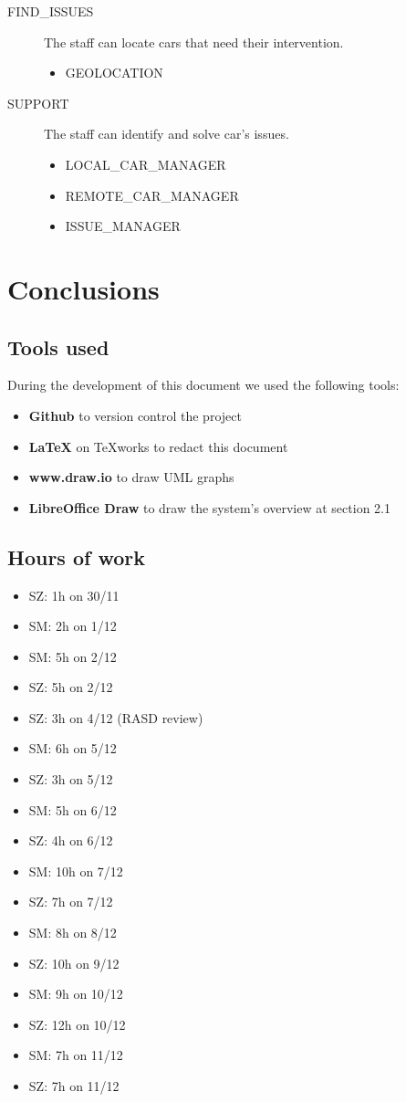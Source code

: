 \documentclass[11pt]{article} %
\begin{document}
\begin{description}
	\item[FIND\_ISSUES] The staff can locate cars that need their intervention.
		\begin{itemize}
			\item GEOLOCATION
		\end{itemize}

	\item[SUPPORT] The staff can identify and solve car’s issues.
		\begin{itemize}
			\item LOCAL\_CAR\_MANAGER
			\item REMOTE\_CAR\_MANAGER
			\item ISSUE\_MANAGER
		\end{itemize}
\end{description}




\newpage
\section{Conclusions}

\subsection{Tools used}
During the development of this document we used the following tools:
\begin{itemize}
	\item \textbf{Github} to version control the project
	\item \textbf{\LaTeX} on TeXworks to redact this document
	\item \textbf{www.draw.io} to draw UML graphs
	\item \textbf{LibreOffice Draw} to draw the system's overview at section 2.1
\end{itemize}

\subsection{Hours of work}
\begin{itemize}
	\item SZ: 1h on 30/11
	\item SM: 2h on 1/12
	\item SM: 5h on 2/12
	\item SZ: 5h on 2/12
	\item SZ: 3h on 4/12 (RASD review)
	\item SM: 6h on 5/12
	\item SZ: 3h on 5/12
	\item SM: 5h on 6/12
	\item SZ: 4h on 6/12
	\item SM: 10h on 7/12
	\item SZ: 7h on 7/12
	\item SM: 8h on 8/12
	\item SZ: 10h on 9/12
	\item SM: 9h on 10/12 
	\item SZ: 12h on 10/12
	\item SM: 7h on 11/12
	\item SZ: 7h on 11/12
\end{itemize}
\end{document}
